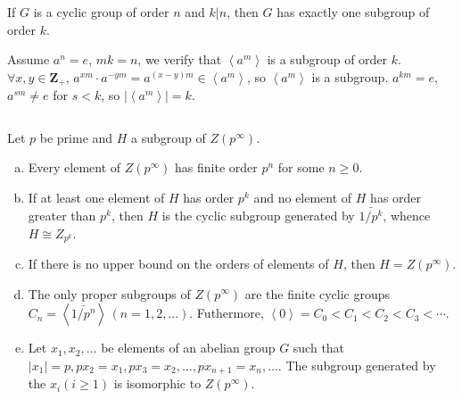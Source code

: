 $$ $$

\begin{ex}
    If $G$ is a cyclic group of order $n$ and $k| n$, then $G$ has exactly one subgroup of order $k$.
\end{ex}

\begin{answer}
    Assume $a^{n}=e$, $mk=n$, we verify that $\left\langle a^{m}\right\rangle$ is a subgroup of order $k$. $\forall x,y\in \mathbf{Z}_{+}$, $a^{xm}\cdot a^{-ym}=a^{(x-y)m}\in \left\langle a^{m}\right\rangle$, so $\left\langle a^{m}\right\rangle$ is a subgroup. $a^{km}=e$, $a^{sm}\neq e$ for $s<k$, so $\left| \left\langle a^{m}\right\rangle \right| =k$.
\end{answer}

$$ $$

\begin{ex}
    Let $p$ be prime and $H$ a subgroup of $Z(p^{\infty})$.
    \begin{enumerate}[(a)]
        \item Every element of $Z(p^{\infty})$ has finite order $p^{n}$ for some $n\geq 0$.
        \item If at least one element of $H$ has order $p^{k}$ and no element of $H$ has order greater than $p^{k}$, then $H$ is the cyclic subgroup generated by $\bar{1/p^{k}}$, whence $H\cong Z_{p^{k}}$.
        \item If there is no upper bound on the orders of elements of $H$, then $H=Z(p^{\infty})$.
        \item The only proper subgroups of $Z(p^{\infty})$ are the finite cyclic groups $C_{n}=\left\langle\bar{1/p^{n}}\right\rangle\,(n=1,2,\dots)$. Futhermore, $\left\langle0\right\rangle=C_{0}<C_{1}<C_{2}<C_{3}<\cdots$.
        \item Let $x_{1},x_{2},\dots$ be elements of an abelian group $G$ such that $\left| x_{1} \right| =p, px_{2}=x_{1},px_{3}=x_{2},\dots,px_{n+1}=x_{n},\dots$. The subgroup generated by the $x_{i}(i\geq 1)$ is isomorphic to $Z(p^{\infty})$. 
    \end{enumerate}
\end{ex}

